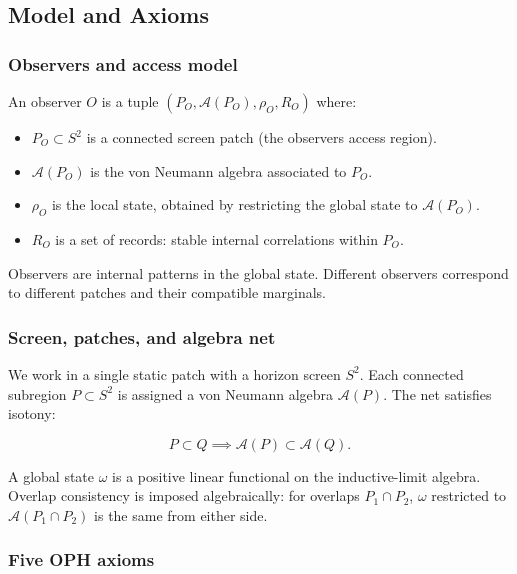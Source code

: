 \subsection{Model and Axioms}\label{1-model-and-axioms}

\subsubsection{Observers and access model}\label{11-observers-and-access-model}

An observer \(O\) is a tuple \((P_O, \mathcal{A}(P_O), \rho_O, R_O)\) where:

\begin{itemize}
\tightlist
\item
  \(P_O \subset S^2\) is a connected screen patch (the observer\textquotesingle s access region).
\item
  \(\mathcal{A}(P_O)\) is the von Neumann algebra associated to \(P_O\).
\item
  \(\rho_O\) is the local state, obtained by restricting the global state to \(\mathcal{A}(P_O)\).
\item
  \(R_O\) is a set of records: stable internal correlations within \(P_O\).
\end{itemize}

Observers are internal patterns in the global state. Different observers correspond to different patches and their compatible marginals.

\subsubsection{Screen, patches, and algebra net}\label{12-screen-patches-and-algebra-net}

We work in a single static patch with a horizon screen \(S^2\). Each connected subregion \(P \subset S^2\) is assigned a von Neumann algebra \(\mathcal{A}(P)\). The net satisfies isotony:

\[
P \subset Q \implies \mathcal{A}(P) \subset \mathcal{A}(Q).
\]

A global state \(\omega\) is a positive linear functional on the inductive-limit algebra. Overlap consistency is imposed algebraically: for overlaps \(P_1 \cap P_2\), \(\omega\) restricted to \(\mathcal{A}(P_1 \cap P_2)\) is the same from either side.

\subsubsection{Five OPH axioms}\label{13-core-axioms}


